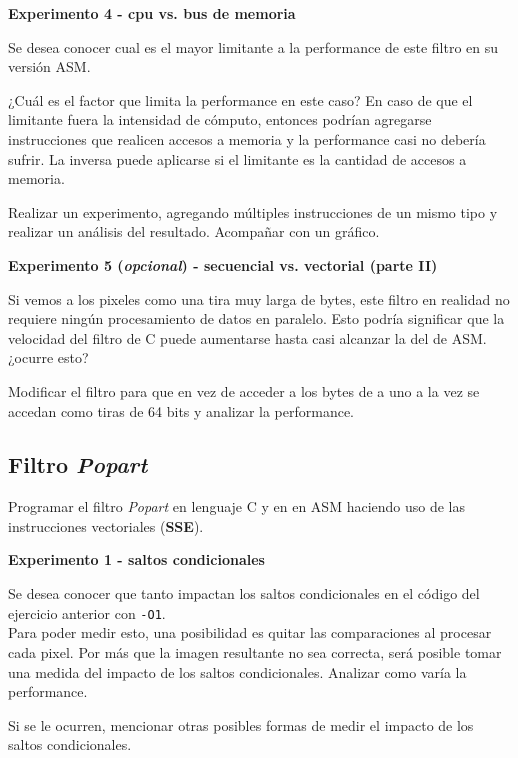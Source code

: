\vspace*{0.3cm} \noindent
\textbf{Experimento 4 - cpu vs. bus de memoria}

	Se desea conocer cual es el mayor limitante a la performance de este filtro en su versión ASM.

	¿Cuál es el factor que limita la performance en este caso? En caso de que el limitante
	fuera la intensidad de cómputo, entonces podrían agregarse instrucciones que realicen
	accesos a memoria y la performance casi no debería sufrir. La inversa puede aplicarse
	si el limitante es la cantidad de accesos a memoria.
	
	Realizar un experimento, agregando múltiples instrucciones de un mismo tipo y realizar un análisis
	del resultado. Acompañar con un gráfico.

\vspace*{0.3cm} \noindent
\textbf{Experimento 5 (\textit{opcional}) - secuencial vs. vectorial (parte II)}

	Si vemos a los pixeles como una tira muy larga de bytes, este filtro en
	realidad no requiere ningún procesamiento de datos en paralelo. Esto podría
	significar que la velocidad del filtro de C puede aumentarse hasta casi
	alcanzar la del de ASM. ¿ocurre esto?
	
	Modificar el filtro para que en vez de acceder a los bytes de a uno a la vez
	se accedan como tiras de 64 bits y analizar la performance.


\subsection*{Filtro \textit{Popart}}

  Programar el filtro \textit{Popart} en lenguaje C y en en ASM haciendo uso de 
  las instrucciones vectoriales (\textbf{SSE}).

\vspace*{0.3cm} \noindent
\textbf{Experimento 1 - saltos condicionales}

	Se desea conocer que tanto impactan los saltos condicionales
	en el código del ejercicio anterior con \verb|-O1|.\\
	Para poder medir esto, una posibilidad es quitar las comparaciones
	al procesar cada pixel. Por más que la imagen resultante no sea correcta,
	será posible tomar una medida del impacto de los saltos condicionales.
	Analizar como varía la performance. 
	
	Si se le ocurren, mencionar otras posibles formas de medir el impacto de los saltos condicionales.


